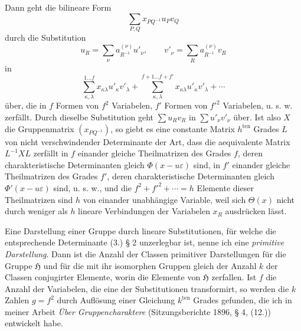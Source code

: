 \documentclass[11pt]{article}
\newcommand{\Hgrp}{\mathfrak{H}}
\newcommand{\eps}{\varepsilon}
\newcommand{\ten}{\mathrm{ten}}
\begin{document}
Dann geht die bilineare Form
\begin{equation}\tag{4.}
\sum_{P,Q}x_{PQ^{-1}}u_Pv_Q
\end{equation}
durch die Substitution
\begin{equation}\tag{5.}
u_R=\sum_\nu a^{(\nu)}_{R^{-1}}u'_\nu,
\qquad
v'_\nu=\sum_R a^{(\nu)}_{R^{-1}}v_R
\end{equation}
in
\begin{equation}\tag{6.}
\sum_{\kappa,\lambda}^{1\ldots f}x_{\kappa\lambda}u'_\kappa v'_\lambda
+\sum_{\kappa,\lambda}^{f+1\ldots f+f'}x_{\kappa\lambda}u'_\kappa v'_\lambda+\cdots
\end{equation}
über, die in $f$ Formen von $f^2$ Variabelen, $f'$ Formen von ${f'}^2$ Variabelen, u. s. w. zerfällt. Durch dieselbe Substitution geht $\sum u_Rv_R$ in $\sum u'_\nu v'_\nu$ über. Ist also $X$ die Gruppenmatrix $(x_{PQ^{-1}})$, so giebt es eine constante Matrix $h^{\ten}$ Grades $L$ von nicht verschwindender Determinante der Art, dass die aequivalente Matrix $L^{-1}XL$ zerfällt in $f$ einander gleiche Theilmatrizen des Grades $f$, deren charakteristische Determinanten gleich $\Phi(x-u\eps)$ sind, in $f'$ einander gleiche Theilmatrizen des Grades $f'$, deren charakteristische Determinanten gleich $\Phi'(x-u\eps)$ sind, u. s. w., und die $f^2+{f'}^2+\cdots=h$ Elemente dieser Theilmatrizen sind $h$ von einander unabhängige Variable, weil sich $\Theta(x)$ nicht durch weniger als $h$ lineare Verbindungen der Variabelen $x_R$ ausdrücken lässt.

Eine Darstellung einer Gruppe durch lineare Substitutionen, für welche die entsprechende Determinante (3.) § 2 unzerlegbar ist, nenne ich eine \emph{primitive Darstellung}. Dann ist die Anzahl der Classen primitiver Darstellungen für die Gruppe $\Hgrp$ und für die mit ihr isomorphen Gruppen gleich der Anzahl $k$ der Classen conjugirter Elemente, worin die Elemente von $\Hgrp$ zerfallen. Ist $f$ die Anzahl der Variabelen, die eine der Substitutionen transformirt, so werden die $k$ Zahlen $g=f^2$ durch Auflösung einer Gleichung $k^{\ten}$ Grades gefunden, die ich in meiner Arbeit \emph{Über Gruppencharaktere} (Sitzungsberichte 1896, § 4, (12.)) entwickelt habe.
\end{document}

